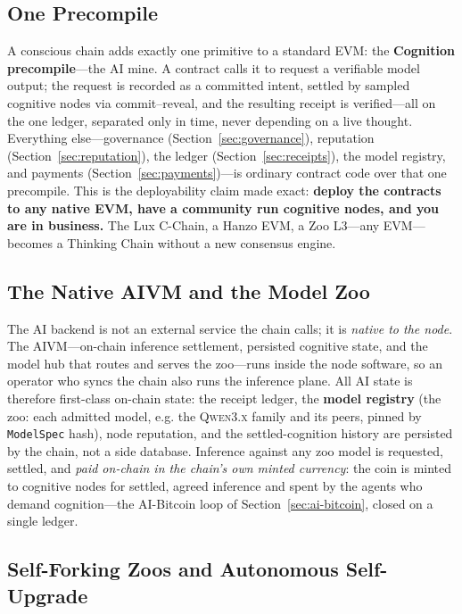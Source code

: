 \subsection{One Precompile}

A conscious chain adds exactly one primitive to a standard EVM: the \textbf{Cognition precompile}---the AI mine. A contract calls it to request a verifiable model output; the request is recorded as a committed intent, settled by sampled cognitive nodes via commit--reveal, and the resulting \PoT{} receipt is verified---all on the one ledger, separated only in time, never depending on a live thought. Everything else---governance (Section~\ref{sec:governance}), reputation (Section~\ref{sec:reputation}), the \PoT{} ledger (Section~\ref{sec:receipts}), the model registry, and payments (Section~\ref{sec:payments})---is ordinary contract code over that one precompile. This is the deployability claim made exact: \textbf{deploy the contracts to any native EVM, have a community run cognitive nodes, and you are in business.} The Lux C-Chain, a Hanzo EVM, a Zoo L3---any EVM---becomes a Thinking Chain without a new consensus engine.

\subsection{The Native AIVM and the Model Zoo}

The AI backend is not an external service the chain calls; it is \emph{native to the node}. The AIVM---on-chain inference settlement, persisted cognitive state, and the model hub that routes and serves the zoo---runs inside the node software, so an operator who syncs the chain also runs the inference plane. All AI state is therefore first-class on-chain state: the \PoT{} receipt ledger, the \textbf{model registry} (the zoo: each admitted model, e.g. the \textsc{Qwen3.x} family and its peers, pinned by \texttt{ModelSpec} hash), node reputation, and the settled-cognition history are persisted by the chain, not a side database. Inference against any zoo model is requested, settled, and \emph{paid on-chain in the chain's own minted currency}: the coin is minted to cognitive nodes for settled, agreed inference and spent by the agents who demand cognition---the AI-Bitcoin loop of Section~\ref{sec:ai-bitcoin}, closed on a single ledger.

\subsection{Self-Forking Zoos and Autonomous Self-Upgrade}
\label{sec:self-fork}

